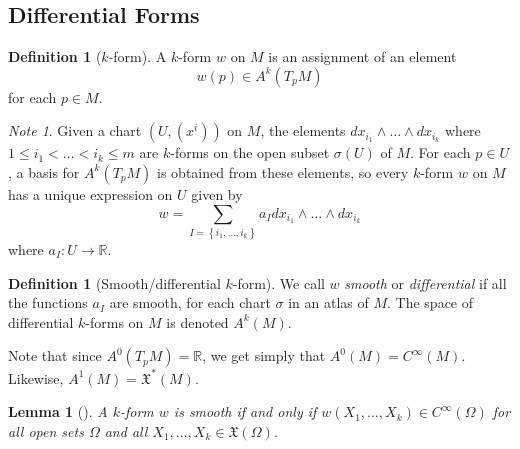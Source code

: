 \documentclass[reqno]{amsart}
\newtheorem{lemma}[theorem]{Lemma}
\theoremstyle{definition}
\newtheorem{definition}[theorem]{Definition}
\theoremstyle{remark}
\newtheorem*{note}{Note}
\begin{document}
      \subsection{Differential Forms}

      \begin{definition}[$k$-form]
          A $k$-form
          $w$ on $M$ is an assignment of an element
          \[
          w(p) \in A^{k}(T_pM)
          \] 
          for each $p \in M$.
      \end{definition}

      \begin{note}
          Given a chart $\left( U, (x^{i}) \right) $ on
          $M$, the elements
          $dx_{i_1} \wedge \ldots \wedge
          dx_{i_k}$ where $1 \le i_1 < \ldots <
          i_k \le m$ are $k$-forms on the open
          subset $\sigma (U)$ of $M$.
          For each $p \in U$, a basis for
          $A^{k}\left( T_pM \right) $ is obtained
          from these elements, so every
          $k$-form $w$ on $M$ has a unique expression
          on $U$ given by
          \[
          w = 
          \sum_{I = \left\{ i_1,\ldots,i_k \right\} }
          a_I dx_{i_1} \wedge \ldots \wedge dx_{i_k}
          \] 
          where $a_I \colon U \to \mathbb{R}$.
      \end{note}

      \begin{definition}[Smooth/differential $k$-form]
          We call $w$ \textit{smooth} or 
          \textit{differential} if all the
          functions $a_I$ are smooth, for each
          chart $\sigma$ in an atlas of $M$. The
          space of differential $k$-forms on $M$ is denoted
          $A^{k}(M)$.
      \end{definition}

      Note that
      since $A^{0}\left( T_pM \right) = \mathbb{R}$, we
      get simply that
      $A^{0}(M) = C^{\infty}(M)$.
      Likewise,
      $A^{1}(M) =
      \mathfrak{X}^{*}(M)$.\\
      \linebreak
      
      \begin{lemma}[]
          A $k$-form $w$ is smooth if
          and only if
          $w \left( X_1, \ldots, X_k \right) \in 
          C^{\infty}(\Omega)$ for all open sets
          $\Omega$ and all $X_1, \ldots, X_k \in 
          \mathfrak{X}(\Omega)$.
      \end{lemma}
\end{document}
